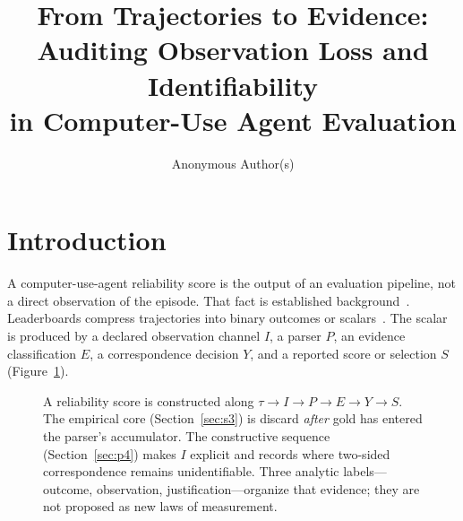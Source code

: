 \documentclass[sigconf,anonymous]{aamas}
\title{From Trajectories to Evidence:\\
Auditing Observation Loss and Identifiability\\
in Computer-Use Agent Evaluation}
\author{Anonymous Author(s)}
\affiliation{%
  \institution{Institution withheld for review}
  \country{}}
\begin{document}
\maketitle


\section{Introduction}
\label{sec:intro}

A computer-use-agent reliability score is the output of an evaluation pipeline, not a direct observation of the episode.
That fact is established background~\citep{dong2026misscore,kane2013validating,messick1995validity}.
Leaderboards compress trajectories into binary outcomes or scalars~\citep{jang2026mypcbench,xie2024osworld,zhou2024webarena}.
The scalar is produced by a declared observation channel $I$, a parser $P$, an evidence classification $E$, a correspondence decision $Y$, and a reported score or selection $S$ (Figure~\ref{fig:gap}).

\begin{figure}[t]
\centering
{}
\caption{A reliability score is constructed along $\tau\to I\to P\to E\to Y\to S$.
The empirical core (Section~\ref{sec:s3}) is discard \emph{after} gold has entered the parser's accumulator.
The constructive sequence (Section~\ref{sec:p4}) makes $I$ explicit and records where two-sided correspondence remains unidentifiable.
Three analytic labels---outcome, observation, justification---organize that evidence; they are not proposed as new laws of measurement.}
\label{fig:gap}
\end{figure}
\end{document}
